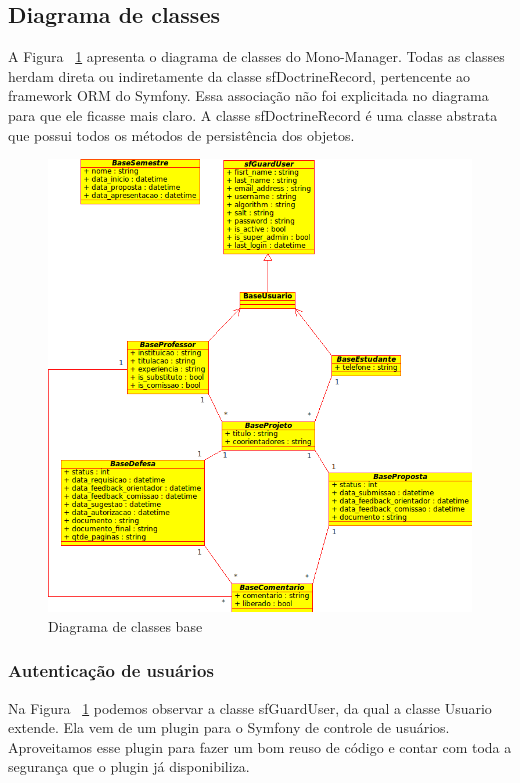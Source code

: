 \subsection{Diagrama de classes}

A Figura ~\ref{fig:diag_classes_base} apresenta o diagrama de classes do Mono-Manager. Todas as classes
herdam direta ou indiretamente da classe sfDoctrineRecord, pertencente ao framework ORM do Symfony. 
Essa associação não foi explicitada no diagrama para que ele ficasse mais claro. A classe sfDoctrineRecord
é uma classe abstrata que possui todos os métodos de persistência dos objetos.

\begin{figure}[htbp]
\centering
\includegraphics[width=1\textwidth]{fig/uml_classes_base.png}
\caption{Diagrama de classes base}
\label{fig:diag_classes_base}
\end{figure}

\subsubsection{Autenticação de usuários}
Na Figura ~\ref{fig:diag_classes_base} podemos observar a classe sfGuardUser, da qual a classe Usuario extende.
Ela vem de um plugin para o Symfony de controle de usuários. Aproveitamos esse plugin
para fazer um bom reuso de código e contar com toda a segurança que o plugin já disponibiliza.

